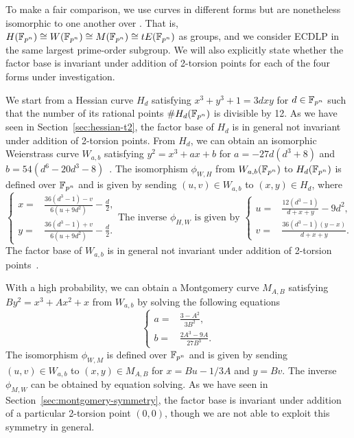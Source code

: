 %
%


%
To make a fair comparison, we use curves in different forms but are
nonetheless isomorphic to one another over .
%
That is, $H(\mathbb F_{p^n})\cong W(\mathbb F_{p^n})\cong M(\mathbb F_{p^n})\cong tE(\mathbb F_{p^n})$
as groups, and we consider ECDLP in the same largest prime-order
subgroup.
%
We will also explicitly state whether the factor base is invariant
under addition of 2-torsion points for each of the four forms under
investigation.

We start from a Hessian curve $H_d$ satisfying $x^3 + y^3 + 1 = 3dxy$
for $d\in\mathbb F_{p^n}$ such that the number of its rational points
$\#H_d(\mathbb F_{p^n})$ is divisible by 12.
%
As we have seen in Section~\ref{sec:hessian-t2}, the factor base of
$H_d$ is in general not invariant under addition of 2-torsion points.
%
From $H_d$, we can obtain an isomorphic Weierstrass curve $W_{a,b}$
satisfying $y^2 = x^3 + ax + b$ for $a = - 27d(d^3 + 8)$ and
$b = 54(d^6 - 20d^3 - 8)$~\cite{DBLP:conf/ches/Smart01}.
%
The isomorphism $\phi_{W,H}$ from $W_{a,b}(\mathbb F_{p^n})$ to $H_d(\mathbb F_{p^n})$
is defined over $\mathbb F_{p^n}$ and is given by sending $(u,v)\in W_{a,b}$
to $(x,y)\in H_d$, where
\[ \left\{\begin{aligned}
      x = & \frac{36(d^3 - 1) - v}{6(u + 9d^2)} - \frac{d}{2}, \\
      y = & \frac{36(d^3 - 1) + v}{6(u + 9d^2)} - \frac{d}{2}.
    \end{aligned}\right. \text{The inverse $\phi_{H,W}$ is given by }
  \left\{\begin{aligned}
      u = & \frac{12(d^3 - 1)}{d + x + y} - 9d^2, \\
      v = & \frac{36(d^3 - 1)(y - x)}{d + x + y}.
    \end{aligned}\right. \]
%
The factor base of $W_{a,b}$ is in general not invariant under
addition of 2-torsion points~\cite{DBLP:journals/joc/FaugereGHR14}.

With a high probability, we can obtain a Montgomery curve $M_{A,B}$
satisfying $By^2 = x^3 + Ax^2 + x$ from $W_{a,b}$ by solving the
following equations
%
\[ \left\{\begin{aligned}
a = & \frac{3 - A^2}{3B^2}, \\
b = & \frac{2A^3 - 9A}{27B^3}.
\end{aligned}\right. \]
%
The isomorphism $\phi_{W,M}$ is defined over $\mathbb F_{p^n}$ and is given by
sending $(u,v)\in W_{a,b}$ to $(x,y)\in M_{A,B}$ for $x = Bu - 1/3A$
and $y = Bv$.
%
The inverse $\phi_{M,W}$ can be obtained by equation solving.
%
As we have seen in Section~\ref{sec:montgomery-symmetry}, the factor
base is invariant under addition of a particular 2-torsion point
$(0,0)$, though we are not able to exploit this symmetry in general.

